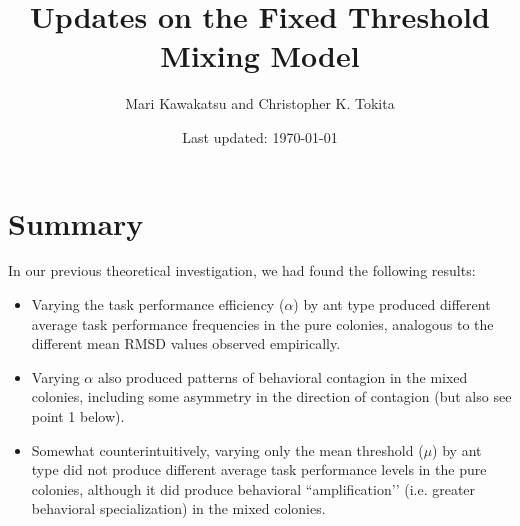 \documentclass[11pt]{article}
\title{\vspace{-30pt}Updates on the Fixed Threshold Mixing Model}
\author{Mari Kawakatsu and Christopher K. Tokita\vspace{-10pt}}
\date{Last updated: \today}
\begin{document}
\maketitle
\vspace{-30pt}
\tableofcontents

\section{Summary} \label{sec:summary}

In our previous theoretical investigation, we had found the following results:
\begin{itemize}

    \item Varying the task performance efficiency ($\alpha$) by ant type produced different average task performance frequencies in the pure colonies, analogous to the different mean RMSD values observed empirically.
    
    \item Varying $\alpha$ also produced patterns of behavioral contagion in the mixed colonies, including  some asymmetry in the direction of contagion (but also see point 1 below).
    
    \item Somewhat counterintuitively, varying only the mean threshold ($\mu$) by ant type did not produce different average task performance levels in the pure colonies, although it did produce behavioral ``amplification’’ (i.e. greater behavioral specialization) in the mixed colonies.

\end{itemize}
\end{document}
